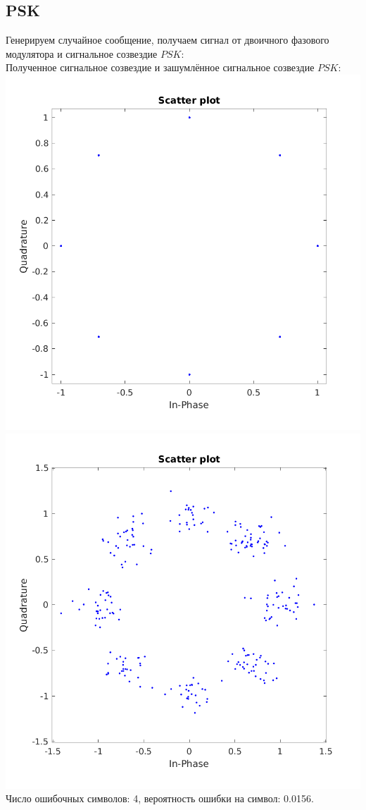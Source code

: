 \documentclass[a4paper]{article}
\begin{document}
\subsection{PSK}
Генерируем случайное сообщение, получаем сигнал от двоичного фазового модулятора и сигнальное созвездие $PSK$:
\\
Полученное сигнальное созвездие и зашумлённое сигнальное созвездие $PSK$:\\
\includegraphics[scale=0.4]{lab6/figures/figure_2.png}
\includegraphics[scale=0.4]{lab6/figures/figure_3.png}\\
Число ошибочных символов: 4, вероятность ошибки на символ: 0.0156.
\end{document}
